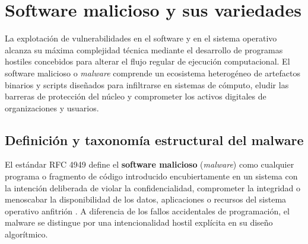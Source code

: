 \documentclass[12pt]{article}
\begin{document}
\section{Software malicioso y sus variedades}\label{sec:softwareMaliciosoVariedades}

La explotación de vulnerabilidades en el software y en el sistema operativo alcanza su máxima complejidad técnica mediante el desarrollo de programas hostiles concebidos para alterar el flujo regular de ejecución computacional. El software malicioso o \textit{malware} comprende un ecosistema heterogéneo de artefactos binarios y scripts diseñados para infiltrarse en sistemas de cómputo, eludir las barreras de protección del núcleo y comprometer los activos digitales de organizaciones y usuarios.

\subsection{Definición y taxonomía estructural del malware}\label{subsec:definicionTaxonomiaMalware}

El estándar RFC 4949 define el \textbf{software malicioso} (\textit{malware}) como cualquier programa o fragmento de código introducido encubiertamente en un sistema con la intención deliberada de violar la confidencialidad, comprometer la integridad o menoscabar la disponibilidad de los datos, aplicaciones o recursos del sistema operativo anfitrión \parencite[\S 2, p.\ 183]{rfc4949}. A diferencia de los fallos accidentales de programación, el malware se distingue por una intencionalidad hostil explícita en su diseño algorítmico.
\end{document}
